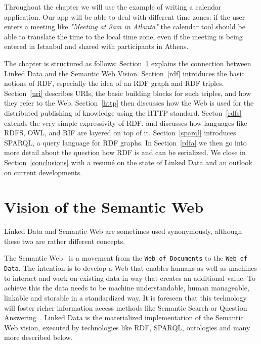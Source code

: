Throughout the chapter we will use the example of writing a calendar application.
Our app will be able to deal with different time zones:
if the user enters a meeting like \textit{"Meeting at 9am in Atlanta"} the calendar tool should be able to translate the time to the local time zone, even if the meeting is being entered in Istanbul and shared with participants in Athens.

The chapter is structured as follows:
Section~\ref{semanticweb} explains the connection between Linked Data and the Semantic Web Vision.
Section~\ref{rdf} introduces the basic notions of \ac{RDF}, especially the idea of an \ac{RDF} graph and \ac{RDF} triples.
Section~\ref{uri} describes URIs, the basic building blocks for such triples, and how they refer to the Web.
Section~\ref{http} then discusses how the Web is used for the distributed publishing of knowledge using the HTTP standard.
Secton~\ref{rdfs} extends the very simple expressivity of \ac{RDF}, and discusses how languages like RDFS, OWL, and RIF are layered on top of it.
Section~\ref{sparql} introduces SPARQL, a query language for \ac{RDF} graphs.
In Section~\ref{rdfa} we then go into more detail about the question how \ac{RDF} is and can be serialized.
We close in Section~\ref{conclusions} with a resum\'{e} on the state of Linked Data and an outlook on current developments.

\section{Vision of the Semantic Web}
\label{semanticweb}

Linked Data and Semantic Web are sometimes used synonymously, although these two are rather different concepts.

The Semantic Web~\cite{bernerslee2001semantic} is a movement from the \texttt{Web of Documents} to the \texttt{Web of Data}.
The intention is to develop a Web that enables humans as well as machines to interact and work on existing data in way that creates an additional value.
To achieve this the data needs to be machine understandable, human manageable, linkable and storable in a standardized way.
It is foreseen that this technology will foster richer information access methods like Semantic Search or Question Answering~\cite{combiningLDandIR}.
Linked Data is the materialized implementation of the Semantic Web vision, executed by technologies like \ac{RDF}, SPARQL, ontologies and many more described below.

